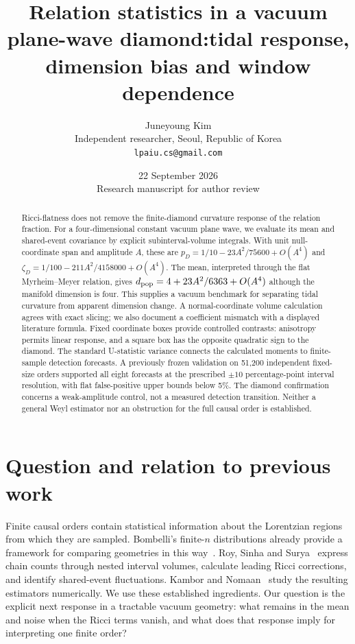 \documentclass[11pt,a4paper]{article}
\title{Relation statistics in a vacuum plane-wave diamond:\newline tidal response, dimension bias and window dependence}
\author{Juneyoung Kim\\\small Independent researcher, Seoul, Republic of Korea\\\small\texttt{lpaiu.cs@gmail.com}}
\date{22 September 2026\\\small Research manuscript for author review}
\begin{document}
\maketitle
\begin{abstract}
Ricci-flatness does not remove the finite-diamond curvature response of the
relation fraction. For a four-dimensional constant vacuum plane wave, we
evaluate its mean and shared-event covariance by explicit subinterval-volume
integrals. With unit null-coordinate span and amplitude $A$, these are
$p_D=1/10-23A^2/75600+O(A^4)$ and
$\zeta_D=1/100-211A^2/4158000+O(A^4)$.
The mean, interpreted through the flat Myrheim--Meyer relation, gives
$d_{\rm pop}=4+23A^2/6363+O(A^4)$ although the manifold dimension is four.
This supplies a vacuum benchmark for separating tidal curvature from apparent
dimension change. A normal-coordinate volume calculation agrees with exact
slicing; we also document a coefficient mismatch with a displayed literature
formula. Fixed coordinate boxes provide controlled contrasts: anisotropy permits
linear response, and a square box has the opposite quadratic sign to the diamond.
The standard U-statistic variance connects the calculated moments to
finite-sample detection forecasts. A previously frozen validation on 51,200
independent fixed-size orders supported all eight forecasts at the prescribed
$\pm10$ percentage-point interval resolution, with flat false-positive upper
bounds below 5\%. The diamond confirmation concerns a weak-amplitude control,
not a measured detection transition. Neither a general Weyl estimator nor
an obstruction for the full causal order is established.
\end{abstract}

\section{Question and relation to previous work}
Finite causal orders contain statistical information about the Lorentzian
regions from which they are sampled. Bombelli's finite-$n$ distributions already
provide a framework for comparing geometries in this way~\cite{bombelli}.
Roy, Sinha and Surya~\cite{roy} express chain counts through nested interval
volumes, calculate leading Ricci corrections, and identify shared-event
fluctuations. Kambor and Nomaan~\cite{kambor} study the resulting estimators
numerically. We use these established ingredients. Our question is the explicit
next response in a tractable vacuum geometry: what remains in the mean and noise
when the Ricci terms vanish, and what does that response imply for interpreting
one finite order?
\end{document}
